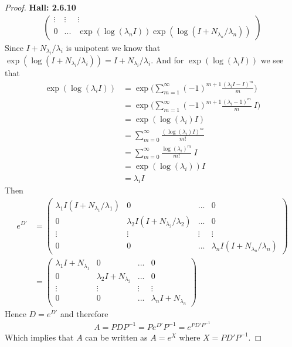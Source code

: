 \documentclass[11pt]{article}
\theoremstyle{definition}
\begin{document}
\begin{proof}{\textbf{Hall: 2.6.10}}
\begin{align*}
\begin{pmatrix}
            \vdots & \vdots & \vdots\\
            0 & ... & \exp(\log(\lambda_nI)) \exp(\log(I + N_{\lambda_n}/\lambda_n))
        \end{pmatrix}
    \end{align*}
    Since $I + N_{\lambda_i}/\lambda_i$ is unipotent we know that
    $\exp(\log(I + N_{\lambda_i}/\lambda_i)) = I + N_{\lambda_i}/\lambda_i$.
    And for $\exp(\log(\lambda_iI))$ we see that 
    \begin{align*}
        \exp(\log(\lambda_iI))
        &= \exp\bigg(\sum_{m = 1}^\infty (-1)^{m+1} \frac{(\lambda_i I - I)^m}{m}\bigg)\\
        &= \exp\bigg(\sum_{m = 1}^\infty (-1)^{m+1} \frac{(\lambda_i-1)^m}{m}~I\bigg)\\
        &= \exp(\log(\lambda_i)I)\\
        &= \sum_{m=0}^\infty \frac{(\log(\lambda_i)I)^m}{m!}\\
        &= \sum_{m=0}^\infty \frac{\log(\lambda_i)^m}{m!}~I\\
        &= \exp(\log(\lambda_i))I\\
        &= \lambda_iI
    \end{align*}
    Then
    \begin{align*}
        e^{D'} &= \begin{pmatrix}
            \lambda_1I(I + N_{\lambda_1}/\lambda_1) & 0 & ... & 0 \\
            0 & \lambda_2I(I + N_{\lambda_2}/\lambda_2) & ... & 0 \\
            \vdots & \vdots & \vdots & \vdots\\
            0 & 0 & ... & \lambda_n I(I + N_{\lambda_n}/\lambda_n)
        \end{pmatrix}\\
        &= \begin{pmatrix}
            \lambda_1I + N_{\lambda_1} & 0 & ... & 0 \\
            0 & \lambda_2I + N_{\lambda_2} & ... & 0 \\
            \vdots & \vdots & \vdots & \vdots\\
            0 & 0 & ... & \lambda_n I + N_{\lambda_n}
        \end{pmatrix}
    \end{align*}
    Hence $D = e^{D'}$ and therefore
    \begin{align*}
        A = PDP^{-1} = Pe^{D'}P^{-1} = e^{PD'P^{-1}}
    \end{align*}
    Which implies that $A$ can be written as $A = e^{X}$ where $X = PD'P^{-1}$.

\end{proof}
\cleardoublepage
\end{document}
